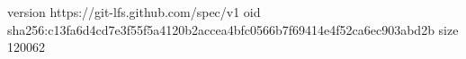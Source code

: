 version https://git-lfs.github.com/spec/v1
oid sha256:c13fa6d4cd7e3f55f5a4120b2accea4bfc0566b7f69414e4f52ca6ec903abd2b
size 120062
